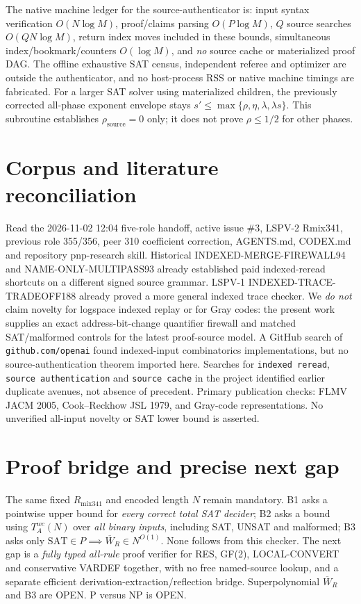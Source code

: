 \documentclass[11pt]{article}
\begin{document}
The native machine ledger for the source-authenticator is: input syntax verification $O(N\log M)$, proof/claims parsing $O(P\log M)$, $Q$ source searches $O(QN\log M)$, return index moves included in these bounds, simultaneous index/bookmark/counters $O(\log M)$, and \emph{no} source cache or materialized proof DAG. The offline exhaustive SAT census, independent referee and optimizer are outside the authenticator, and no host-process RSS or native machine timings are fabricated. For a larger SAT solver using materialized children, the previously corrected all-phase exponent envelope stays $s'\le\max\{\rho,\eta,\lambda,\lambda s\}$. This subroutine establishes $\rho_{\mathrm{source}}=0$ only; it does not prove $\rho\le1/2$ for other phases.

\section*{Corpus and literature reconciliation}
Read the 2026-11-02 12:04 five-role handoff, active issue \#3, LSPV-2 Rmix341, previous role 355/356, peer 310 coefficient correction, AGENTS.md, CODEX.md and repository pnp-research skill. Historical INDEXED-MERGE-FIREWALL94 and NAME-ONLY-MULTIPASS93 already established paid indexed-reread shortcuts on a different signed source grammar. LSPV-1 INDEXED-TRACE-TRADEOFF188 already proved a more general indexed trace checker. We \emph{do not} claim novelty for logspace indexed replay or for Gray codes: the present work supplies an exact address-bit-change quantifier firewall and matched SAT/malformed controls for the latest proof-source model. A GitHub search of \texttt{github.com/openai} found indexed-input combinatorics implementations, but no source-authentication theorem imported here. Searches for \texttt{indexed reread}, \texttt{source authentication} and \texttt{source cache} in the project identified earlier duplicate avenues, not absence of precedent. Primary publication checks: FLMV JACM 2005, Cook--Reckhow JSL 1979, and Gray-code representations. No unverified all-input novelty or SAT lower bound is asserted.

\section*{Proof bridge and precise next gap}
The same fixed $R_{\mathrm{mix341}}$ and encoded length $N$ remain mandatory. B1 asks a pointwise upper bound for \emph{every correct total SAT decider}; B2 asks a bound using $T_A^{wc}(N)$ over \emph{all binary inputs}, including SAT, UNSAT and malformed; B3 asks only $\mathrm{SAT}\in P\implies\overline W_R\in N^{O(1)}$. None follows from this checker. The next gap is a \emph{fully typed all-rule} proof verifier for RES, GF(2), LOCAL-CONVERT and conservative VARDEF together, with no free named-source lookup, and a separate efficient derivation-extraction/reflection bridge. Superpolynomial $\overline W_R$ and B3 are OPEN. P versus NP is OPEN.
\end{document}

